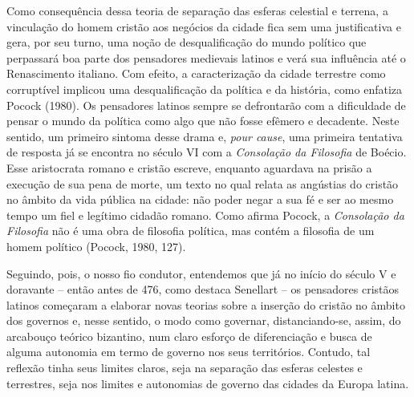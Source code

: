 Como consequência dessa teoria de separação das esferas celestial e
terrena, a vinculação do homem cristão aos negócios da cidade fica sem
uma justificativa e gera, por seu turno, uma noção de desqualificação do
mundo político que perpassará boa parte dos pensadores medievais latinos
e verá sua influência até o Renascimento italiano. Com efeito, a
caracterização da cidade terrestre como corruptível implicou uma
desqualificação da política e da história, como enfatiza Pocock (1980).
Os pensadores latinos sempre se defrontarão com a dificuldade de pensar
o mundo da política como algo que não fosse efêmero e decadente. Neste
sentido, um primeiro sintoma desse drama e, \emph{pour cause}, uma
primeira tentativa de resposta já se encontra no século VI com a
\emph{Consolação da Filosofia} de Boécio. Esse aristocrata romano e
cristão escreve, enquanto aguardava na prisão a execução de sua pena de
morte, um texto no qual relata as angústias do cristão no âmbito da vida
pública na cidade: não poder negar a sua fé e ser ao mesmo tempo um fiel
e legítimo cidadão romano. Como afirma Pocock, a \emph{Consolação da
Filosofia} não é uma obra de filosofia política, mas contém a filosofia
de um homem político (Pocock, 1980, 127).

Seguindo, pois, o nosso fio condutor, entendemos que já no início do
século V e doravante -- então antes de 476, como destaca Senellart -- os
pensadores cristãos latinos começaram a elaborar novas teorias sobre a
inserção do cristão no âmbito dos governos e, nesse sentido, o modo como
governar, distanciando-se, assim, do arcabouço teórico bizantino, num
claro esforço de diferenciação e busca de alguma autonomia em termo de
governo nos seus territórios. Contudo, tal reflexão tinha seus limites
claros, seja na separação das esferas celestes e terrestres, seja nos
limites e autonomias de governo das cidades da Europa latina.

